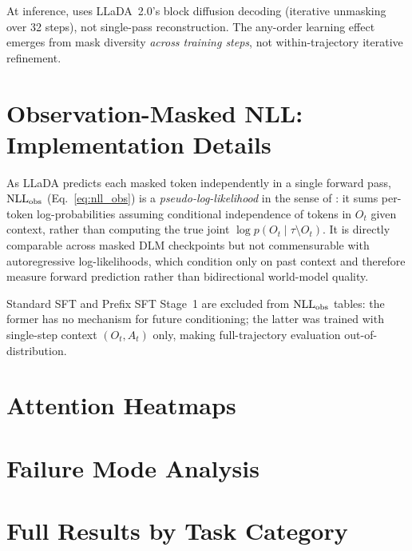 At inference, \aomt{} uses LLaDA~2.0's block diffusion decoding (iterative
unmasking over 32 steps), not single-pass reconstruction. The any-order
learning effect emerges from mask diversity \emph{across training steps},
not within-trajectory iterative refinement.

\section{Observation-Masked NLL: Implementation Details}
\label{app:nll_details}

As LLaDA predicts each masked token independently in a single forward pass,
$\mathrm{NLL}_{\text{obs}}$ (Eq.~\eqref{eq:nll_obs}) is a \emph{pseudo-log-likelihood}
in the sense of \citet{salazar2020masked}: it sums per-token log-probabilities
assuming conditional independence of tokens in $O_t$ given context, rather than
computing the true joint $\log p(O_t \mid \tau \setminus O_t)$. It is directly
comparable across masked DLM checkpoints but not commensurable with
autoregressive log-likelihoods, which condition only on past context and
therefore measure forward prediction rather than bidirectional world-model quality.

Standard SFT and Prefix SFT Stage~1 are excluded from $\mathrm{NLL}_{\text{obs}}$
tables: the former has no mechanism for future conditioning; the latter was
trained with single-step context $(O_t, A_t)$ only, making full-trajectory
evaluation out-of-distribution.

\section{Attention Heatmaps}
\label{app:attention}


\section{Failure Mode Analysis}
\label{app:failures}


\section{Full Results by Task Category}
\label{app:full_results}

